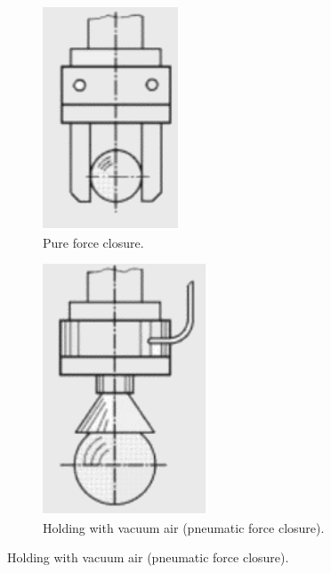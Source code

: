 \begin{figure}[h!]
{\begin{tcolorbox}
\begin{subfigure}[c]{0.25\textwidth}
         \label{fig:g2}
     \end{subfigure}
     \qquad
     \begin{subfigure}[c]{0.25\textwidth}
         \centering
         \includegraphics[width=.5\textwidth]{Apendices/Figuras/g3_gray_bg.pdf}
         \caption{Pure force closure.}
         \label{fig:g3}
     \end{subfigure}
	\qquad
     \begin{subfigure}[c]{0.25\textwidth}
         \centering
         \includegraphics[width=.5\textwidth]{Apendices/Figuras/g4_gray_bg.pdf}
         \caption{Holding with vacuum air (pneumatic force closure).}

\end{subfigure}
\end{tcolorbox}}
\end{figure}
